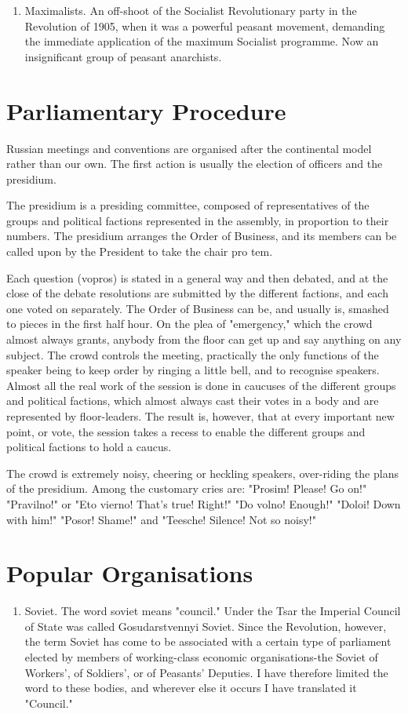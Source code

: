 \begin{enumerate}
\begin{enumerate}
\item Maximalists. An off-shoot of the Socialist Revolutionary party in the Revolution of 1905, when it was a powerful peasant movement, demanding the immediate application of the maximum Socialist programme. Now an insignificant group of peasant anarchists.
\end{enumerate}
\section*{Parliamentary Procedure}

Russian meetings and conventions are organised after the continental model rather than our own. The first action is usually the election of officers and the presidium.

The presidium is a presiding committee, composed of representatives of the groups and political factions represented in the assembly, in proportion to their numbers. The presidium arranges the Order of Business, and its members can be called upon by the President to take the chair pro tem.

Each question (vopros) is stated in a general way and then debated, and at the close of the debate resolutions are submitted by the different factions, and each one voted on separately. The Order of Business can be, and usually is, smashed to pieces in the first half hour. On the plea of "emergency," which the crowd almost always grants, anybody from the floor can get up and say anything on any subject. The crowd controls the meeting, practically the only functions of the speaker being to keep order by ringing a little bell, and to recognise speakers. Almost all the real work of the session is done in caucuses of the different groups and political factions, which almost always cast their votes in a body and are represented by floor-leaders. The result is, however, that at every important new point, or vote, the session takes a recess to enable the different groups and political factions to hold a caucus.

The crowd is extremely noisy, cheering or heckling speakers, over-riding the plans of the presidium. Among the customary cries are: "Prosim! Please! Go on!" "Pravilno!" or "Eto vierno! That's true! Right!" "Do volno! Enough!" "Doloi! Down with him!" "Posor! Shame!" and "Teesche! Silence! Not so noisy!"

\section*{Popular Organisations}
\begin{enumerate}
\item Soviet. The word soviet means "council." Under the Tsar the Imperial Council of State was called Gosudarstvennyi Soviet. Since the Revolution, however, the term Soviet has come to be associated with a certain type of parliament elected by members of working-class economic organisations-the Soviet of Workers', of Soldiers', or of Peasants' Deputies. I have therefore limited the word to these bodies, and wherever else it occurs I have translated it "Council."


\end{enumerate}
\end{enumerate}
